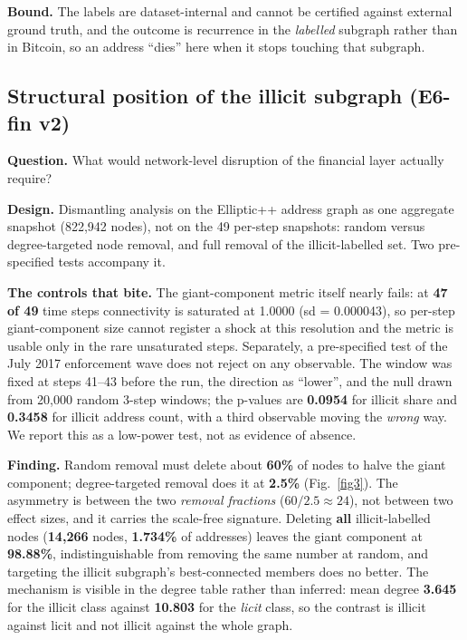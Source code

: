 \textbf{Bound.} The labels are dataset-internal and cannot be certified against
external ground truth, and the outcome is recurrence in the \emph{labelled}
subgraph rather than in Bitcoin, so an address ``dies'' here when it stops
touching that subgraph.

\subsection{Structural position of the illicit subgraph (E6-fin v2)}\label{sec:e6fin}

\textbf{Question.} What would network-level disruption of the financial layer
actually require?

\textbf{Design.} Dismantling analysis on the Elliptic++ address graph as one
aggregate snapshot (822,942 nodes), not on the 49 per-step snapshots: random
versus degree-targeted node removal, and full removal of the illicit-labelled
set. Two pre-specified tests accompany it.

\textbf{The controls that bite.} The giant-component metric itself nearly fails:
at \textbf{47 of 49} time steps connectivity is saturated at 1.0000 (sd =
0.000043), so per-step giant-component size cannot register a shock at this
resolution and the metric is usable only in the rare unsaturated steps.
Separately, a pre-specified test of the July 2017 enforcement wave does not
reject on any observable. The window was fixed at steps 41--43 before the run,
the direction as ``lower'', and the null drawn from 20,000 random 3-step
windows; the p-values are \textbf{0.0954} for illicit share and \textbf{0.3458}
for illicit address count, with a third observable moving the \emph{wrong} way.
We report this as a low-power test, not as evidence of absence.

\textbf{Finding.} Random removal must delete about \textbf{60\%} of nodes to
halve the giant component; degree-targeted removal does it at \textbf{2.5\%}
(Fig.~\ref{fig3}).
The asymmetry is between the two \emph{removal fractions} ($60/2.5 \approx 24$),
not between two effect sizes, and it carries the scale-free signature. Deleting
\textbf{all} illicit-labelled nodes (\textbf{14,266} nodes, \textbf{1.734\%} of
addresses) leaves the giant component at \textbf{98.88\%}, indistinguishable
from removing the same number at random, and targeting the illicit subgraph's
best-connected members does no better. The mechanism is visible in the degree
table rather than inferred: mean degree \textbf{3.645} for the illicit class
against \textbf{10.803} for the \emph{licit} class, so the contrast is illicit
against licit and not illicit against the whole graph.

